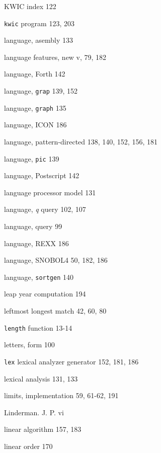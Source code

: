 \begin{multicols}{3}
\hangindent=3pc  KWIC index 122

\hangindent=3pc  \verb'kwic' program 123, 203

\hangindent=3pc  language, asembly 133

\hangindent=3pc  language features, new v, 79, 182

\hangindent=3pc  language, Forth 142

\hangindent=3pc  language, \verb'grap' 139, 152

\hangindent=3pc  language, \verb'graph' 135

\hangindent=3pc  language, ICON 186

\hangindent=3pc  language, pattern-directed 138, 140, 152, 156, 181

\hangindent=3pc  language, \verb'pic' 139

\hangindent=3pc  language, Postscript 142

\hangindent=3pc  language processor model 131

\hangindent=3pc  language, \textit{q} query 102, 107

\hangindent=3pc  language, query 99

\hangindent=3pc  language, REXX 186

\hangindent=3pc  language, SNOBOL4 50, 182, 186

\hangindent=3pc  language, \verb'sortgen' 140

\hangindent=3pc  leap year computation 194

\hangindent=3pc  leftmost longest match 42, 60, 80

\hangindent=3pc  \verb'length' function 13-14

\hangindent=3pc  letters, form 100

\hangindent=3pc  \verb'lex' lexical analyzer generator 152, 181, 186

\hangindent=3pc  lexical analysis 131, 133

\hangindent=3pc  limits, implementation 59, 61-62, 191

\hangindent=3pc  Linderman. J. P. vi

\hangindent=3pc  linear algorithm 157, 183

\hangindent=3pc  linear order 170


\end{multicols}
